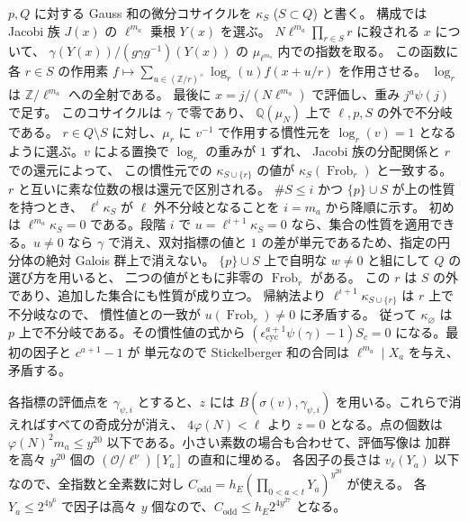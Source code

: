 \(p,Q\) に対する Gauss 和の微分コサイクルを \(\kappa_S\) (\(S\subset Q\)) と書く。
構成では Jacobi 族 \(J(x)\) の \(\ell^{m_a}\) 乗根 \(Y(x)\) を選ぶ。
\(N\ell^{m_a}\prod_{r\in S}r\) に殺される \(x\) について、
\(\gamma(Y(x))/(g\gamma g^{-1})(Y(x))\) の \(\mu_{\ell^{m_a}}\) 内での指数を取る。
この函数に各 \(r\in S\) の作用素
\(f\mapsto\sum_{u\in(\mathbb Z/r)^\times}\log_r(u)f(x+u/r)\) を作用させる。
\(\log_r\) は \(\mathbb Z/\ell^{m_a}\) への全射である。
最後に \(x=j/(N\ell^{m_a})\) で評価し、重み \(j^a\psi(j)\) で足す。
このコサイクルは \(\gamma\) で零であり、
\(\mathbb Q(\mu_N)\) 上で \(\ell,p,S\) の外で不分岐である。
\(r\in Q\setminus S\) に対し、\(\mu_r\) に \(v^{-1}\) で作用する慣性元を
\(\log_r(v)=1\) となるように選ぶ。\(v\) による置換で \(\log_r\) の重みが \(1\) ずれ、
Jacobi 族の分配関係と \(r\) での還元によって、
この慣性元での \(\kappa_{S\cup\{r\}}\) の値が
\(\kappa_S(\operatorname{Frob}_r)\) と一致する。
\(r\) と互いに素な位数の根は還元で区別される。
\(\#S\le i\) かつ \(\{p\}\cup S\) が上の性質を持つとき、
\(\ell^i\kappa_S\) が \(\ell\) 外不分岐となることを \(i=m_a\) から降順に示す。
初めは \(\ell^{m_a}\kappa_S=0\) である。段階 \(i\) で \(u=\ell^{i+1}\kappa_S=0\)
なら、集合の性質を適用できる。\(u\ne0\) なら \(\gamma\) で消え、双対指標の値と \(1\)
の差が単元であるため、指定の円分体の絶対 Galois 群上で消えない。
\(\{p\}\cup S\) 上で自明な \(w\ne0\) と組にして \(Q\) の選び方を用いると、
二つの値がともに非零の \(\operatorname{Frob}_r\) がある。
この \(r\) は \(S\) の外であり、追加した集合にも性質が成り立つ。
帰納法より \(\ell^{i+1}\kappa_{S\cup\{r\}}\) は \(r\) 上で不分岐なので、
慣性値との一致が \(u(\operatorname{Frob}_r)\ne0\) に矛盾する。
従って \(\kappa_\varnothing\) は \(p\) 上で不分岐である。その慣性値の式から
\((\epsilon_{\mathrm{cyc}}^{a+1}\psi(\gamma)-1)S_c=0\) になる。最初の因子と \(c^{a+1}-1\) が
単元なので Stickelberger 和の合同は \(\ell^{m_a}\mid X_a\) を与え、矛盾する。

各指標の評価点を \(\gamma_{\psi,i}\) とすると、\(z\) には
\(B(\sigma(v),\gamma_{\psi,i})\) を用いる。これらで消えればすべての奇成分が消え、
\(4\varphi(N)<\ell\) より \(z=0\) となる。点の個数は
\(\varphi(N)^2m_a\le y^{20}\) 以下である。小さい素数の場合も合わせて、評価写像は
加群を高々 \(y^{20}\) 個の \((\mathcal O/\ell^\nu)[Y_a]\) の直和に埋める。
各因子の長さは \(v_\ell(Y_a)\) 以下なので、全指数と全素数に対し
\(C_{\mathrm{odd}}=h_E(\prod_{0<a<t}Y_a)^{y^{20}}\) が使える。
各 \(Y_a\le 2^{4y^6}\) で因子は高々 \(y\) 個なので、\(C_{\mathrm{odd}}\le h_E2^{4y^{27}}\) となる。
